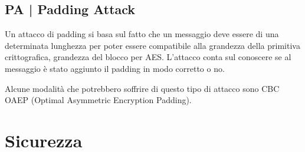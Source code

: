 \subsection{PA | Padding Attack}

\textsf{\small Un attacco di padding si basa sul fatto che un messaggio deve essere di una determinata lunghezza per poter essere compatibile alla grandezza della primitiva crittografica, grandezza del blocco per AES. L'attacco conta sul conoscere se al messaggio è stato aggiunto il padding in modo corretto o no.}

\textsf{\small Alcune modalità che potrebbero soffrire di questo tipo di attacco sono CBC OAEP (Optimal Asymmetric Encryption Padding).} %


\section{Sicurezza}

\textsf{\small }


